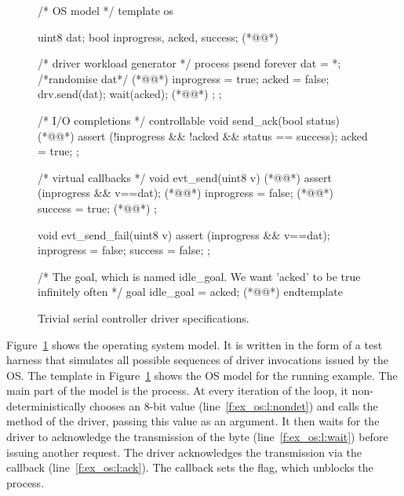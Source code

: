 \begin{figure}
\lstset{firstnumber=last}
\begin{tsllisting}[name=ex]
/* OS model */
template os 

    uint8 dat;
    bool inprogress, acked, success; (*@\label{f:ex_os:l:vars}@*)

    /* driver workload generator */
    process psend {
        forever {
            dat = *; /*randomise dat*/ (*@\label{f:ex_os:l:nondet}@*)
            inprogress = true;
            acked = false;
            drv.send(dat);
            wait(acked); (*@\label{f:ex_os:l:wait}@*)
        };
    };

    /* I/O completions */
    controllable void send_ack(bool status) { (*@\label{f:ex_os:l:ack}@*)
        assert (!inprogress && !acked && status == success);
        acked = true;
    };

    /* virtual callbacks */
    void evt_send(uint8 v) { (*@\label{f:ex_os:l:send_cb}@*)
        assert (inprogress && v==dat); (*@\label{f:ex_os:l:assert}@*)
        inprogress = false; (*@\label{f:ex_os:l:inprogress}@*)
        success = true; (*@\label{f:ex_os:l:success}@*)
    };

    void evt_send_fail(uint8 v) {
        assert (inprogress && v==dat);
        inprogress = false;
        success = false;
    };

    /* The goal, which is named idle_goal. We want 'acked' to be 
    true infinitely often */
    goal idle_goal = acked; (*@\label{f:ex_os:l:goal}@*)
endtemplate
\end{tsllisting}
\caption{Trivial serial controller driver specifications.}
\label{f:ex_os}
\end{figure}

Figure~\ref{f:ex_os} shows the operating system model. It is written in the form of a test harness that simulates all possible sequences of driver invocations issued by the OS\@.  The  template in Figure~\ref{f:ex_os} shows the OS model for the running example.  The main part of the model is the  process.  At every iteration of the loop, it non-deterministically chooses an 8-bit value (line~\ref{f:ex_os:l:nondet}) and calls the  method of the driver, passing this value as an argument.  It then waits for the driver to acknowledge the transmission of the byte (line~\ref{f:ex_os:l:wait}) before issuing another request.  The driver acknowledges the transmission via the  callback (line~\ref{f:ex_os:l:ack}).  The callback sets the  flag, which unblocks the  process.

